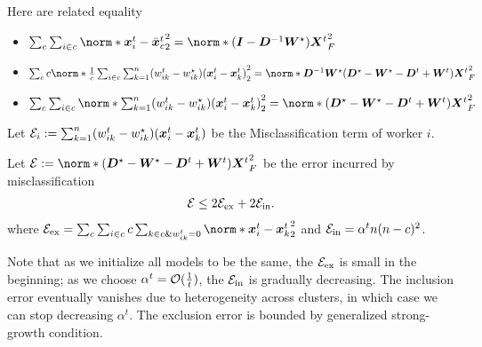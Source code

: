 \documentclass{article}
\begin{document}
Here are related equality
\begin{itemize}
  \item $\sum_c\sum_{i\in c} \norm*{ \xx^t_i - \bar{\xx}_c^{t} }_2^2=\norm*{(\mI - \mD^{-1}\mW^\star) \mX^{t}}_F^2$
  \item $\sum_c c\norm*{\frac{1}{c}\sum_{i\in c} \sum_{k=1}^n (w^t_{ik}-w^{\star}_{ik})(\xx^t_i - \xx^t_k)}_2^2=\norm*{\mD^{-1}\mW^\star(\mD^\star - \mW^\star - \mD^t + \mW^t)\mX^t}_F^2$
  \item $\sum_c \sum_{i\in c}\norm*{ \sum_{k=1}^n (w^t_{ik}-w^{\star}_{ik})(\xx^t_i - \xx^t_k)}_2^2=\norm*{(\mD^\star - \mW^\star - \mD^t + \mW^t)\mX^t}_F^2$
\end{itemize}
Let $\mathcal{E}_i:= \sum_{k=1}^n (w^t_{ik}-w^{\star}_{ik})(\bm{x}^t_i - \bm{x}^t_k)$ be the Misclassification term of worker $i$.
\begin{lemma}
  Let $\cE:=\norm*{(\mD^\star - \mW^\star - \mD^t + \mW^t)\mX^t}_F^2$
  be the error incurred by misclassification
  \begin{align*}
    \mathcal{E}
    \le 2 \mathcal{E}_\text{ex} + 2  \mathcal{E}_\text{in}.
  \end{align*}
  where $\cE_\text{ex}=\sum_c \sum_{i\in c} c \sum_{k\in c \& w_{ik}^t = 0}  \norm*{ \xx^t_i - \xx^t_k}_2^2$ and $\mathcal{E}_\text{in} = \alpha^t n (n-c)^2 $.
\end{lemma}
Note that as we initialize all models to be the same, the $\mathcal{E}_\text{ex}$ is small in the beginning; as we choose $\alpha^t=\mathcal{O}(\frac{1}{t})$, the $\mathcal{E}_\text{in}$ is gradually decreasing. The inclusion error eventually vanishes due to heterogeneity across clusters, in which case we can stop decreasing $\alpha^t$. The exclusion error is bounded by generalized strong-growth condition.
\begin{lemma}
  
\end{lemma}
\end{document}

